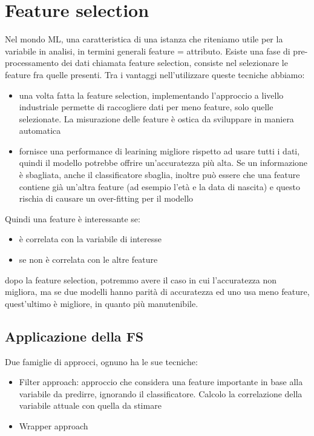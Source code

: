\documentclass{article}
\begin{document}
\section{Feature selection}
Nel mondo ML, una caratteristica di una istanza che riteniamo utile per la variabile in analisi, in termini generali feature = attributo. Esiste una fase di pre-processamento dei dati chiamata feature selection, consiste nel selezionare le feature fra quelle presenti. Tra i vantaggi nell'utilizzare queste tecniche abbiamo:
\begin{itemize}
\item una volta fatta la feature selection, implementando l'approccio a livello industriale permette di raccogliere dati per meno feature, solo quelle selezionate. La misurazione delle feature è ostica da sviluppare in maniera automatica
\item fornisce una performance di learining migliore rispetto ad usare tutti i dati, quindi il modello potrebbe offrire un'accuratezza più alta. Se un informazione è sbagliata, anche il classificatore sbaglia, inoltre può essere che una feature contiene già un'altra feature (ad esempio l'età e la data di nascita) e questo rischia di causare un over-fitting per il modello
\end{itemize}
Quindi una feature è interessante se:
\begin{itemize}
\item è correlata con la variabile di interesse
\item se non è correlata con le altre feature
\end{itemize}
dopo la feature selection, potremmo avere il caso in cui l'accuratezza non migliora, ma se due modelli hanno parità di accuratezza ed uno usa meno feature, quest'ultimo è migliore, in quanto più manutenibile.
\subsection{Applicazione della FS}
Due famiglie di approcci, ognuno ha le sue tecniche:
\begin{itemize}
\item Filter approach: approccio che considera una feature importante in base alla variabile da predirre, ignorando il classificatore. Calcolo la correlazione della variabile attuale con quella da stimare
\item Wrapper approach
\end{itemize}
\end{document}
